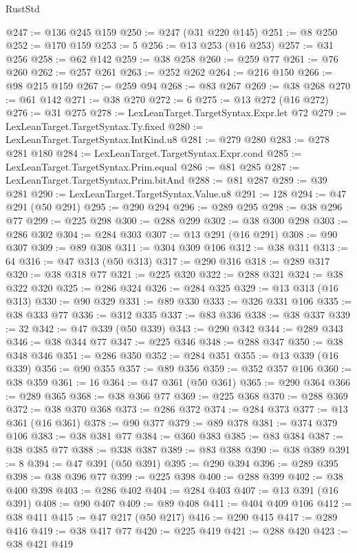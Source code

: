 \begin{lexlean}{RustStd}
\begin{coremodule}
@247 := @136 @245 @159
@250 := @247 (@31 @220 @145)
@251 := @8 @250
@252 := @170 @159
@253 := 5
@256 := @13 @253 (@16 @253)
@257 := @31 @256
@258 := @62 @142
@259 := @38 @258
@260 := @259 @77
@261 := @76 @260
@262 := @257 @261
@263 := @252 @262
@264 := @216 @150
@266 := @98 @215 @159
@267 := @259 @94
@268 := @83 @267
@269 := @38 @268
@270 := @61 @142
@271 := @38 @270
@272 := 6
@275 := @13 @272 (@16 @272)
@276 := @31 @275
@278 := LexLeanTarget.TargetSyntax.Expr.let @72
@279 := LexLeanTarget.TargetSyntax.Ty.fixed
@280 := LexLeanTarget.TargetSyntax.IntKind.u8
@281 := @279 @280
@283 := @278 @281 @180
@284 := LexLeanTarget.TargetSyntax.Expr.cond
@285 := LexLeanTarget.TargetSyntax.Prim.equal
@286 := @81 @285
@287 := LexLeanTarget.TargetSyntax.Prim.bitAnd
@288 := @81 @287
@289 := @39 @281
@290 := LexLeanTarget.TargetSyntax.Value.u8
@291 := 128
@294 := @47 @291 (@50 @291)
@295 := @290 @294
@296 := @289 @295
@298 := @38 @296 @77
@299 := @225 @298
@300 := @288 @299
@302 := @38 @300 @298
@303 := @286 @302
@304 := @284 @303
@307 := @13 @291 (@16 @291)
@308 := @90 @307
@309 := @89 @308
@311 := @304 @309 @106
@312 := @38 @311
@313 := 64
@316 := @47 @313 (@50 @313)
@317 := @290 @316
@318 := @289 @317
@320 := @38 @318 @77
@321 := @225 @320
@322 := @288 @321
@324 := @38 @322 @320
@325 := @286 @324
@326 := @284 @325
@329 := @13 @313 (@16 @313)
@330 := @90 @329
@331 := @89 @330
@333 := @326 @331 @106
@335 := @38 @333 @77
@336 := @312 @335
@337 := @83 @336
@338 := @38 @337
@339 := 32
@342 := @47 @339 (@50 @339)
@343 := @290 @342
@344 := @289 @343
@346 := @38 @344 @77
@347 := @225 @346
@348 := @288 @347
@350 := @38 @348 @346
@351 := @286 @350
@352 := @284 @351
@355 := @13 @339 (@16 @339)
@356 := @90 @355
@357 := @89 @356
@359 := @352 @357 @106
@360 := @38 @359
@361 := 16
@364 := @47 @361 (@50 @361)
@365 := @290 @364
@366 := @289 @365
@368 := @38 @366 @77
@369 := @225 @368
@370 := @288 @369
@372 := @38 @370 @368
@373 := @286 @372
@374 := @284 @373
@377 := @13 @361 (@16 @361)
@378 := @90 @377
@379 := @89 @378
@381 := @374 @379 @106
@383 := @38 @381 @77
@384 := @360 @383
@385 := @83 @384
@387 := @38 @385 @77
@388 := @338 @387
@389 := @83 @388
@390 := @38 @389
@391 := 8
@394 := @47 @391 (@50 @391)
@395 := @290 @394
@396 := @289 @395
@398 := @38 @396 @77
@399 := @225 @398
@400 := @288 @399
@402 := @38 @400 @398
@403 := @286 @402
@404 := @284 @403
@407 := @13 @391 (@16 @391)
@408 := @90 @407
@409 := @89 @408
@411 := @404 @409 @106
@412 := @38 @411
@415 := @47 @217 (@50 @217)
@416 := @290 @415
@417 := @289 @416
@419 := @38 @417 @77
@420 := @225 @419
@421 := @288 @420
@423 := @38 @421 @419

\end{coremodule}
\end{lexlean}
